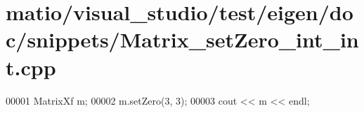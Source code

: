 \hypertarget{matio_2visual__studio_2test_2eigen_2doc_2snippets_2_matrix__set_zero__int__int_8cpp_source}{}\section{matio/visual\+\_\+studio/test/eigen/doc/snippets/\+Matrix\+\_\+set\+Zero\+\_\+int\+\_\+int.cpp}
\label{matio_2visual__studio_2test_2eigen_2doc_2snippets_2_matrix__set_zero__int__int_8cpp_source}

\begin{DoxyCode}
00001 MatrixXf m;
00002 m.setZero(3, 3);
00003 cout << m << endl;
\end{DoxyCode}
